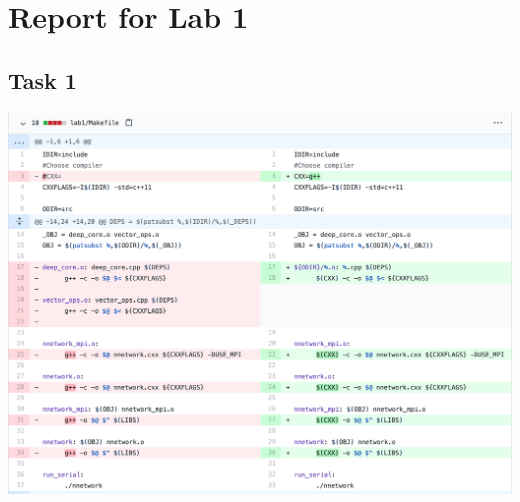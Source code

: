 \documentclass[a4paper, DIV12, headsepline]{scrartcl}
\begin{document}
\section*{Report for Lab 1}
\subsection*{Task 1}
\begin{center}
	\includegraphics[scale=0.3]{task1 diff.png}
\end{center}
\end{document}
